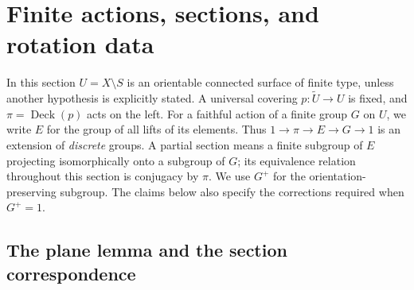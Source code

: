 \section{Finite actions, sections, and rotation data}
\label{sec:partB}

In this section $U=X\setminus S$ is an orientable connected surface of finite type,
unless another hypothesis is explicitly stated. A universal covering
$p:\widetilde U\to U$ is fixed, and $\pi=\operatorname{Deck}(p)$ acts on the left.
For a faithful action of a finite group $G$ on $U$, we write $E$ for the group of
all lifts of its elements. Thus $1\to\pi\to E\to G\to1$ is an extension of
\emph{discrete} groups. A partial section means a finite subgroup of $E$ projecting
isomorphically onto a subgroup of $G$; its equivalence relation throughout this
section is conjugacy by $\pi$. We use $G^+$ for the orientation-preserving subgroup.
The claims below also specify the corrections required when $G^+=1$.

\subsection{The plane lemma and the section correspondence}


